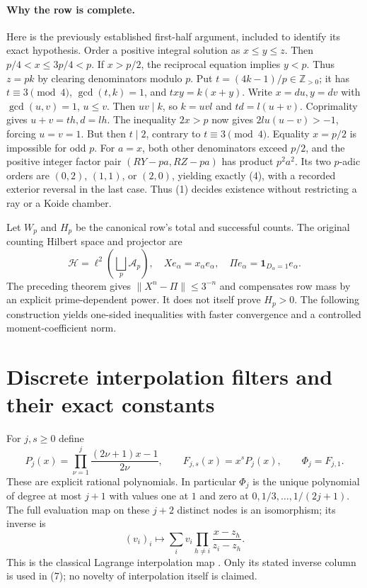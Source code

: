 \paragraph{Why the row is complete.}
Here is the previously established first-half argument, included to identify
its exact hypothesis. Order a positive integral solution as $x\le y\le z$.
Then $p/4<x\le3p/4<p$. If $x>p/2$, the reciprocal equation implies
$y<p$. Thus $z=pk$ by clearing denominators modulo $p$. Put
$t=(4k-1)/p\in\mathbb Z_{>0}$; it has $t\equiv3\pmod4$,
$\gcd(t,k)=1$, and $txy=k(x+y)$. Write $x=du,y=dv$ with
$\gcd(u,v)=1$, $u\le v$. Then $uv\mid k$, so $k=uvl$ and
$td=l(u+v)$. Coprimality gives $u+v=th,d=lh$.
The inequality $2x>p$ now gives $2lu(u-v)>-1$, forcing $u=v=1$.
But then $t\mid2$, contrary to $t\equiv3\pmod4$.
Equality $x=p/2$ is impossible for odd $p$.
For $a=x$, both other denominators exceed $p/2$, and the positive integer
factor pair $(RY-pa,RZ-pa)$ has product $p^2a^2$. Its two $p$-adic orders are
$(0,2)$, $(1,1)$, or $(2,0)$, yielding exactly (4), with a recorded exterior
reversal in the last case. Thus (1) decides existence without restricting a ray
or a Koide chamber.

Let $W_p$ and $H_p$ be the canonical row's total and successful counts.
The original counting Hilbert space and projector are
\[
 \mathcal H=\ell^2\!\left(\bigsqcup_p\mathscr A_p\right),\quad
 Xe_\alpha=x_\alpha e_\alpha,\quad
 \Pi e_\alpha=\mathbf1_{D_\alpha=1}e_\alpha.
 \tag{6}
\]
The preceding theorem gives $\|X^n-\Pi\|\le3^{-n}$ and compensates row
mass by an explicit prime-dependent power. It does not itself prove $H_p>0$.
The following construction yields one-sided inequalities with faster
convergence and a controlled moment-coefficient norm.

\section{Discrete interpolation filters and their exact constants}
For $j,s\ge0$ define
\[
 P_j(x)=\prod_{\nu=1}^j\frac{(2\nu+1)x-1}{2\nu},\qquad
 F_{j,s}(x)=x^sP_j(x),\qquad \Phi_j=F_{j,1}.
 \tag{7}
\]
These are explicit rational polynomials. In particular $\Phi_j$ is the unique
polynomial of degree at most $j+1$ with values one at $1$ and zero at
$0,1/3,\ldots,1/(2j+1)$. The full evaluation map on these $j+2$ distinct
nodes is an isomorphism; its inverse is
\[
 (v_i)_i\longmapsto\sum_i v_i\prod_{h\ne i}\frac{x-z_h}{z_i-z_h}.
 \tag{8}
\]
This is the classical Lagrange interpolation map \cite[\S3.3(i)]{DLMF}.
Only its stated inverse column is used in (7); no novelty of interpolation
itself is claimed.

